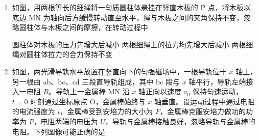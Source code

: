 \documentclass[\gkver]{gaokaozhenti}
\begin{document}
\begin{enumerate}
{故选 B。
}

\item
如图，用两根等长的细绳将一匀质圆柱体悬挂在竖直木板的 P 点，将木板以底边 MN 为轴向后方缓慢转动直至水平，绳与木板之间的夹角保持不变，忽略圆柱体与木板之间的摩擦，在转动过程中


{圆柱体对木板的压力先增大后减小}
{两根细绳上的拉力均先增大后减小}
{两根细绳对圆柱体拉力的合力保持不变}


\item
如图，两光滑导轨水平放置在竖直向下的匀强磁场中，一根导轨位于 $x$ 轴上，另一根由 ab、bc、cd 三段直导轨组成，其中 bc 段与 $x$ 轴平行，导轨左端接入一电阻 $R$。导轨上一金属棒 MN 沿 $x$ 轴正向以速度 $v_{0}$ 保持匀速运动，$t=0$ 时刻通过坐标原点 O，金属棒始终与 $x$ 轴垂直。设运动过程中通过电阻的电流强度为 $i$，金属棒受到安培力的大小为 $F$，金属棒克服安培力做功的功率为 $P$，电阻两端的电压为 $U$，导轨与金属棒接触良好，忽略导轨与金属棒的电阻。下列图像可能正确的是


\end{enumerate}
\end{document}
